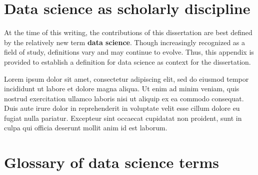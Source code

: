 \begin{appendices}



\chapter{Data science as scholarly discipline}

At the time of this writing, the contributions of this dissertation are best defined by the relatively new term \textbf{data science}. Though increasingly recognized as a field of study, definitions vary and may continue to evolve. Thus, this appendix is provided to establish a definition for data science as context for the dissertation.

Lorem ipsum dolor sit amet, consectetur adipiscing elit, sed do eiusmod tempor incididunt ut labore et dolore magna aliqua. Ut enim ad minim veniam, quis nostrud exercitation ullamco laboris nisi ut aliquip ex ea commodo consequat. Duis aute irure dolor in reprehenderit in voluptate velit esse cillum dolore eu fugiat nulla pariatur. Excepteur sint occaecat cupidatat non proident, sunt in culpa qui officia deserunt mollit anim id est laborum.

\chapter{Glossary of data science terms}



\end{appendices}
